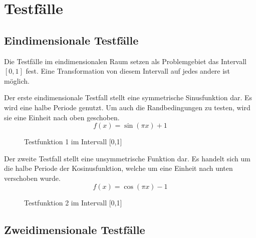 \section{Testfälle}
\subsection{Eindimensionale Testfälle}

Die Testfälle im eindimensionalen Raum setzen als Problemgebiet das
Intervall $[0,1]$ fest. Eine Transformation von diesem Intervall auf jedes 
andere ist möglich.

Der erste eindimensionale Testfall stellt eine symmetrische Sinusfunktion
dar. Es wird eine halbe Periode genutzt. Um auch die Randbedingungen zu testen,
wird sie eine Einheit nach oben geschoben.
\begin{equation}
f(x) = \sin(\pi x)+1
\end{equation}
\begin{figure}[h]
\centering
\caption{Testfunktion 1 im Intervall [0,1]}
\label{fig:testfn1}
\end{figure}


Der zweite Testfall stellt eine unsymmetrische Funktion dar. Es handelt sich um
die halbe Periode der Kosinusfunktion, welche um eine Einheit nach unten verschoben wurde.
\begin{equation}
f(x) = \cos(\pi x) -1
\end{equation}
\begin{figure}[h]
\centering
\caption{Testfunktion 2 im Intervall [0,1]}
\label{fig:testfn2}
\end{figure}

\clearpage
\subsection{Zweidimensionale Testfälle}

